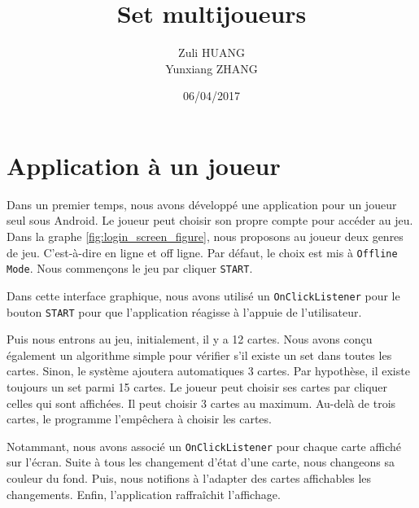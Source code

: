 \documentclass[titlepage,11pt,a4paper]{article}
\title[INF 431 Programming Project]{Set multijoueurs}
\author{Zuli \textsc{HUANG}\\
            Yunxiang \textsc{ZHANG}
            }
\date{06/04/2017}
\begin{document}
\maketitle

\section{Application à un joueur}

Dans un premier temps, nous avons développé une application pour un joueur seul sous Android. Le joueur peut choisir son propre compte pour accéder au jeu. Dans la graphe \ref{fig:login_screen_figure}, nous proposons au joueur deux genres de jeu. C'est-à-dire en ligne et off ligne. Par défaut, le choix est mis à \texttt{Offline Mode}. Nous commençons le jeu par cliquer \texttt{START}.\\


\begin{figure}[h]
\centering
{}
\end{figure}
Dans cette interface graphique, nous avons utilisé un \texttt{OnClickListener} pour le bouton \texttt{START} pour que l'application réagisse à l'appuie de l'utilisateur.

Puis nous entrons au jeu, initialement, il y a 12 cartes. Nous avons conçu également un algorithme simple pour vérifier s'il existe un set dans toutes les cartes. Sinon, le système ajoutera automatiques 3 cartes. Par hypothèse, il existe toujours un set parmi 15 cartes. Le joueur peut choisir ses cartes par cliquer celles qui sont affichées. Il peut choisir 3 cartes au maximum. Au-delà de trois cartes, le programme l'empêchera à choisir les cartes.

Notammant, nous avons associé un \texttt{OnClickListener} pour chaque carte affiché sur l'écran. Suite à tous les changement d'état d'une carte, nous changeons sa couleur du fond. Puis, nous notifions à l'adapter des cartes affichables les changements. Enfin, l'application raffraîchit l'affichage.
\begin{figure}[h]
\centering
{}
\end{figure}
\end{document}
